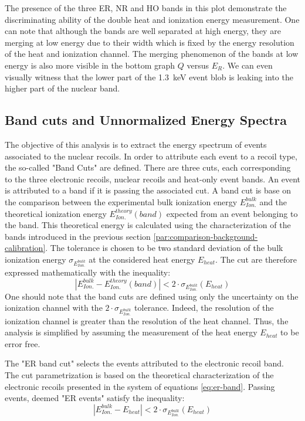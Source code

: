 The presence of the three ER, NR and HO bands in this plot demonstrate the discriminating ability of the double heat and ionization energy measurement. One can note that although the bands are well separated at high energy, they are merging at low energy due to their width which is fixed by the energy resolution of the heat and ionization channel. The merging phenomenon of the bands at low energy is also more visible in the bottom graph $Q$ versus $E_R$. We can even visually witness that the lower part of the \SI{1.3}{\kilo\eV} event blob is leaking into the higher part of the nuclear band.


\subsection{Band cuts and Unnormalized Energy Spectra}
\label{par:band-cut}

The objective of this analysis is to extract the energy spectrum of events associated to the nuclear recoils. In order to attribute each event to a recoil type, the so-called "Band Cuts" are defined. There are three cuts, each corresponding to the three electronic recoils, nuclear recoils and heat-only event bands. An event is attributed to a band if it is passing the associated cut. A band cut is base on the comparison between the experimental bulk ionization energy $E_{Ion.}^{bulk}$ and the theoretical ionization energy $E_{Ion.}^{theory}(band)$ expected from an event belonging to the band. This theoretical energy is calculated using the characterization of the bands introduced in the previous section \ref{par:comparison-background-calibration}. The tolerance is chosen to be two standard deviation of the bulk ionization energy $\sigma_{E_{Ion.}^{bulk}}$ at the considered heat energy $E_{heat}$. The cut are therefore expressed mathematically with the inequality:
\begin{equation}
|E_{Ion.}^{bulk} - E_{Ion.}^{theory}(band)| < 2 \cdot \sigma_{E_{Ion.}^{bulk}} \left( E_{heat}\right)
\end{equation}
One should note that the band cuts are defined using only the uncertainty on the ionization channel with the $2 \cdot \sigma_{E_{Ion.}^{bulk}}$ tolerance. Indeed, the resolution of the ionization channel is greater than the resolution of the heat channel. Thus, the analysis is simplified by assuming the measurement of the heat energy $E_{heat}$ to be error free.

The "ER band cut" selects the events attributed to the electronic recoil band. The cut parametri\-za\-tion is based on the theoretical characterization of the electronic recoils presented in the system of equations \ref{eq:er-band}. Passing events, deemed "ER events" satisfy the inequality:
\begin{equation}
\label{eq:condition-ER-ecei}
|E_{Ion.}^{bulk} - E_ {heat}| < 2 \cdot \sigma_{E_{Ion.}^{bulk}} \left( E_{heat}\right)
\end{equation}

